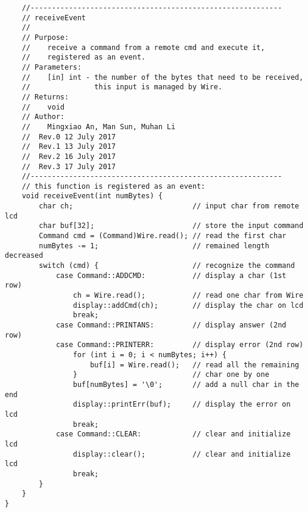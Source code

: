 \begin{verbatim}
    //-----------------------------------------------------------  
    // receiveEvent
    //  
    // Purpose:  
    //    receive a command from a remote cmd and execute it, 
    //    registered as an event.
    // Parameters:  
    //    [in] int - the number of the bytes that need to be received,
    //               this input is managed by Wire.
    // Returns:  
    //    void  
    // Author:  
    //    Mingxiao An, Man Sun, Muhan Li
    //  Rev.0 12 July 2017
    //  Rev.1 13 July 2017
    //  Rev.2 16 July 2017
    //  Rev.3 17 July 2017
    //-----------------------------------------------------------
    // this function is registered as an event:
    void receiveEvent(int numBytes) {
        char ch;                            // input char from remote lcd
        char buf[32];                       // store the input command
        Command cmd = (Command)Wire.read(); // read the first char
        numBytes -= 1;                      // remained length decreased
        switch (cmd) {                      // recognize the command
            case Command::ADDCMD:           // display a char (1st row)
                ch = Wire.read();           // read one char from Wire
                display::addCmd(ch);        // display the char on lcd
                break;
            case Command::PRINTANS:         // display answer (2nd row)
            case Command::PRINTERR:         // display error (2nd row)
                for (int i = 0; i < numBytes; i++) {
                    buf[i] = Wire.read();   // read all the remaining 
                }                           // char one by one
                buf[numBytes] = '\0';       // add a null char in the end
                display::printErr(buf);     // display the error on lcd
                break;
            case Command::CLEAR:            // clear and initialize lcd
                display::clear();           // clear and initialize lcd
                break;
        }
    }
}

\end{verbatim}

